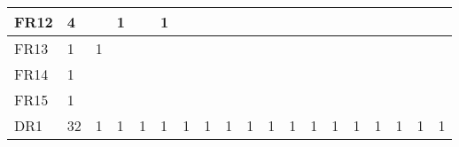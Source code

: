 \begin{table}[]
{\begin{tabular}{|l|l|l|l|l|l|l|l|l|l|l|l|l|l|l|l|l|l|l|}
FR12 & 4                                                     &                                                  & 1  &    & 1  &    &                                                  &    &    &    &    &                                                   &    &                                                   &    &                                                             &                                                             &                                                             \\ \hline
FR13 & 1                                                     & 1                                                &    &    &    &    &                                                  &    &    &    &    &                                                   &    &                                                   &    &                                                             &                                                             &                                                             \\ \hline
FR14 & 1                                                     &                                                  &    &    &    &    &                                                  &    &    &    &    &                                                   &    &                                                   &    &                                                             &                                                             &                                                             \\ \hline
FR15 & 1                                                     &                                                  &    &    &    &    &                                                  &    &    &    &    &                                                   &    &                                                   &    &                                                             &                                                             &                                                             \\ \hline
DR1  & 32                                                    & 1                                                & 1  & 1  & 1  & 1  & 1                                                & 1  & 1  & 1  & 1  & 1                                                 & 1  & 1                                                 & 1  & 1                                                           & 1                                                           & 1                                                           \\ \hline

\end{tabular}}
\end{table}
